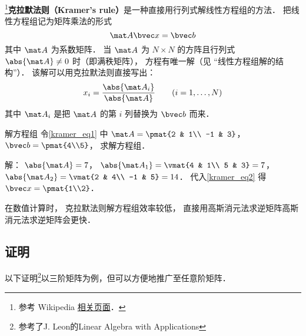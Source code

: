 
\begin{issues}
\issueTODO
\end{issues}


\footnote{参考 Wikipedia \href{https://en.wikipedia.org/wiki/Cramer's_rule}{相关页面}．}\textbf{克拉默法则（Kramer's rule）}是一种直接用行列式解线性方程组的方法． 把线性方程组记为矩阵乘法的形式
\begin{equation}\label{kramer_eq1}
\mat A \bvec x = \bvec b
\end{equation}
其中 $\mat A$ 为系数矩阵． 当 $\mat A$ 为 $N\times N$ 的方阵且行列式 $\abs{\mat A} \ne 0$ 时（即满秩矩阵）， 方程有唯一解（见 “线性方程组解的结构”）． 该解可以用克拉默法则直接写出：
\begin{equation}\label{kramer_eq2}
x_i = \frac{\abs{\mat A_i}}{\abs{\mat A}} \qquad (i = 1, \dots, N)
\end{equation}
其中 $\mat A_i$ 是把 $\mat A$ 的第 $i$ 列替换为 $\bvec b$ 而来．

\begin{example}{解方程组}
令\autoref{kramer_eq1} 中 $\mat A = \pmat{2 & 1\\ -1 & 3}$， $\bvec b = \pmat{4\\5}$， 求解方程组．

解： $\abs{\mat A} = 7$， $\abs{\mat A_1} = \vmat{4 & 1\\ 5 & 3} = 7$， $\abs{\mat A_2} = \vmat{2 & 4\\ -1 & 5} = 14$． 代入\autoref{kramer_eq2} 得 $\bvec x = \pmat{1\\2}$．
\end{example}

在数值计算时， 克拉默法则解方程组效率较低， 直接用高斯消元法求逆矩阵高斯消元法求逆矩阵会更快．

\subsection{证明}
以下证明\footnote{参考了J. Leon的Linear Algebra with Applications}以三阶矩阵为例，但可以方便地推广至任意阶矩阵．

